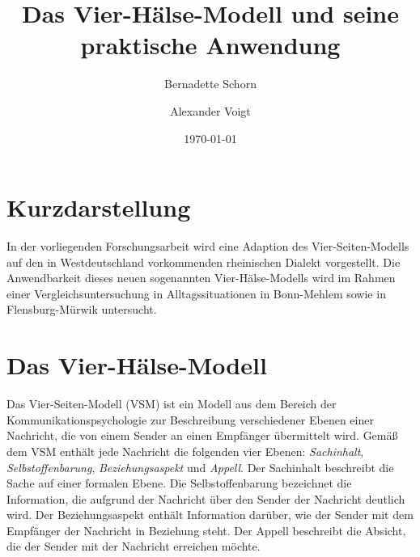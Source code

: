 \documentclass[11pt,DIV16,twocolumn]{scrartcl}
\title{Das Vier-Hälse-Modell und seine praktische Anwendung}
\author{Bernadette Schorn}
\author{Alexander Voigt}
\affil{Institut f\"{u}r Angewandte Philologie, Rheinische Universit\"{a}t Flensburg}
\date{\today}
\begin{document}
\maketitle

\section*{Kurzdarstellung}

In der vorliegenden Forschungsarbeit wird eine Adaption des
Vier-Seiten-Modells auf den in Westdeutschland vorkommenden
rheinischen Dialekt vorgestellt.  Die Anwendbarkeit dieses neuen
sogenannten Vier-Hälse-Modells wird im Rahmen einer
Vergleichsuntersuchung in Alltagssituationen in Bonn-Mehlem sowie in
Flensburg-Mürwik untersucht.

\section{Das Vier-Hälse-Modell}

Das Vier-Seiten-Modell (VSM) \cite{VSM} ist ein Modell aus dem Bereich
der Kommunikationspsychologie zur Beschreibung verschiedener Ebenen
einer Nachricht, die von einem Sender an einen Empfänger übermittelt
wird.  Gemäß dem VSM enthält jede Nachricht die folgenden vier Ebenen:
\textit{Sachinhalt}, \textit{Selbstoffenbarung},
\textit{Beziehungsaspekt} und \textit{Appell}.
%
Der Sachinhalt beschreibt die Sache auf einer formalen Ebene.  Die
Selbstoffenbarung bezeichnet die Information, die aufgrund der
Nachricht über den Sender der Nachricht deutlich wird.  Der
Beziehungsaspekt enthält Information darüber, wie der Sender mit dem
Empfänger der Nachricht in Beziehung steht.  Der Appell beschreibt die
Absicht, die der Sender mit der Nachricht erreichen möchte.
\end{document}

